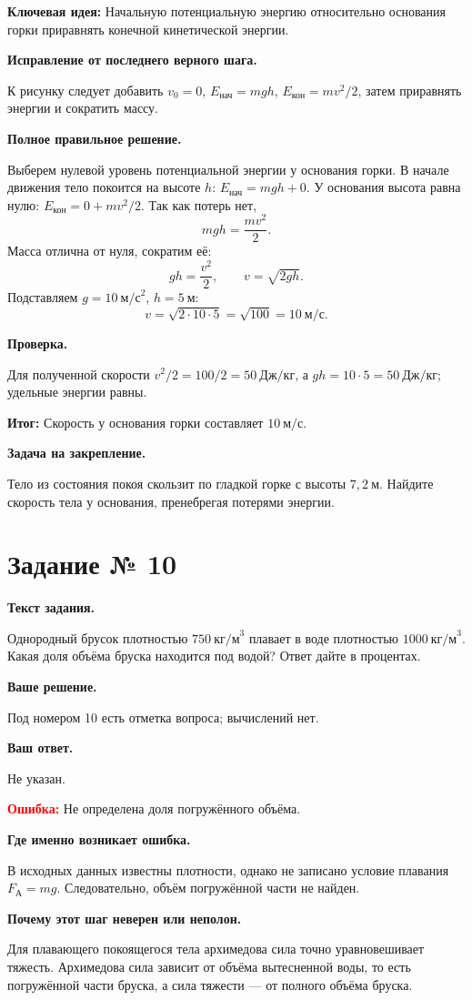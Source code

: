 \documentclass[11pt,a4paper]{article}
\newcommand{\reviewblock}[2]{\par\medskip\noindent\textbf{#1}\par\noindent#2\par}
\newcommand{\errorblock}[1]{\par\medskip\noindent\textcolor{red}{\textbf{Ошибка:}} #1\par}
\newcommand{\ideablock}[1]{\par\medskip\noindent\textcolor{blue!60!black}{\textbf{Ключевая идея:}} #1\par}
\newcommand{\resultblock}[1]{\par\medskip\noindent\textcolor{teal!60!black}{\textbf{Итог:}} #1\par}
\begin{document}
\ideablock{Начальную потенциальную энергию относительно основания горки приравнять конечной кинетической энергии.}

\reviewblock{Исправление от последнего верного шага.}{К рисунку следует добавить $v_0=0$, $E_{\text{нач}}=mgh$, $E_{\text{кон}}=mv^2/2$, затем приравнять энергии и сократить массу.}

\reviewblock{Полное правильное решение.}{Выберем нулевой уровень потенциальной энергии у основания горки. В начале движения тело покоится на высоте $h$: $E_{\text{нач}}=mgh+0$. У основания высота равна нулю: $E_{\text{кон}}=0+mv^2/2$. Так как потерь нет,
\[mgh=\frac{mv^2}{2}.\]
Масса отлична от нуля, сократим её:
\[gh=\frac{v^2}{2},\qquad v=\sqrt{2gh}.\]
Подставляем $g=10\ \text{м/с}^2$, $h=5\ \text{м}$:
\[v=\sqrt{2\cdot10\cdot5}=\sqrt{100}=10\ \text{м/с}.\]}

\reviewblock{Проверка.}{Для полученной скорости $v^2/2=100/2=50\ \text{Дж/кг}$, а $gh=10\cdot5=50\ \text{Дж/кг}$; удельные энергии равны.}

\resultblock{Скорость у основания горки составляет $10\ \text{м/с}$.}

\reviewblock{Задача на закрепление.}{Тело из состояния покоя скользит по гладкой горке с высоты $7{,}2\ \text{м}$. Найдите скорость тела у основания, пренебрегая потерями энергии.}
\newpage
{}\label{task:10}

\section*{Задание № 10}

\reviewblock{Текст задания.}{Однородный брусок плотностью $750\ \text{кг/м}^3$ плавает в воде плотностью $1000\ \text{кг/м}^3$. Какая доля объёма бруска находится под водой? Ответ дайте в процентах.}

\reviewblock{Ваше решение.}{Под номером 10 есть отметка вопроса; вычислений нет.}

\reviewblock{Ваш ответ.}{Не указан.}

\errorblock{Не определена доля погружённого объёма.}

\reviewblock{Где именно возникает ошибка.}{В исходных данных известны плотности, однако не записано условие плавания $F_{\text{А}}=mg$. Следовательно, объём погружённой части не найден.}

\reviewblock{Почему этот шаг неверен или неполон.}{Для плавающего покоящегося тела архимедова сила точно уравновешивает тяжесть. Архимедова сила зависит от объёма вытесненной воды, то есть погружённой части бруска, а сила тяжести --- от полного объёма бруска.}
\end{document}
